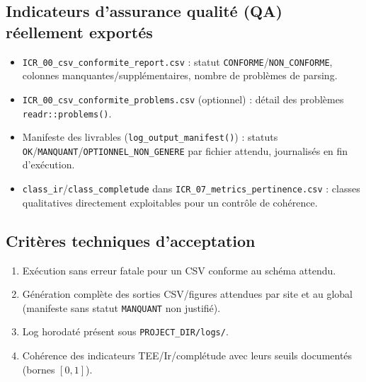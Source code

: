 \documentclass[11pt,a4paper]{article}
\begin{document}
\subsection{Indicateurs d'assurance qualité (QA) réellement exportés}
\begin{itemize}[leftmargin=1.2cm]
  \item \texttt{ICR\_00\_csv\_conformite\_report.csv} : statut \texttt{CONFORME}/\texttt{NON\_CONFORME}, colonnes manquantes/supplémentaires, nombre de problèmes de parsing.
  \item \texttt{ICR\_00\_csv\_conformite\_problems.csv} (optionnel) : détail des problèmes \texttt{readr::problems()}.
  \item Manifeste des livrables (\texttt{log\_output\_manifest()}) : statuts \texttt{OK}/\texttt{MANQUANT}/\texttt{OPTIONNEL\_NON\_GENERE} par fichier attendu, journalisés en fin d'exécution.
  \item \texttt{class\_ir}/\texttt{class\_completude} dans \texttt{ICR\_07\_metrics\_pertinence.csv} : classes qualitatives directement exploitables pour un contrôle de cohérence.
\end{itemize}

\subsection{Critères techniques d'acceptation}
\begin{enumerate}
  \item Exécution sans erreur fatale pour un CSV conforme au schéma attendu.
  \item Génération complète des sorties CSV/figures attendues par site et au global (manifeste sans statut \texttt{MANQUANT} non justifié).
  \item Log horodaté présent sous \texttt{PROJECT\_DIR/logs/}.
  \item Cohérence des indicateurs TEE/Ir/complétude avec leurs seuils documentés (bornes $[0,1]$).
\end{enumerate}
\end{document}
